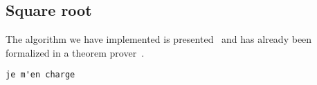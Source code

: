 \subsection{Square root}
The algorithm we have implemented is presented~\cite{RecSqrt} and has already
been formalized in a theorem prover~\cite{BerMagZim02}.

\begin{verbatim}
je m'en charge
\end{verbatim}
